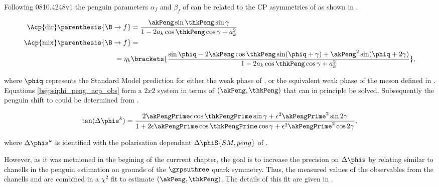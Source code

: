 Following {\color{red} 0810.4248v1} the penguin parameters $\alpha_f$ and $\beta_f$ of 
can be related to the CP asymmetries of  as shown in .

\begin{subequations}
  \label{bsjpsiphi_peng_acp_obs}
\begin{align}
  \Acp{\rm dir}\parenthesis{\B\to f} &= \frac{ \akPeng \sin\thkPeng \sin\gamma} {1 - 2 a_k \cos\thkPeng \cos\gamma + a_k^{2}}
  \label{bsjpsiphi_peng_acp_dir} \\
  \Acp{\rm mix}\parenthesis{\B\to f} &= \nonumber \\
   = \eta_k & \brackets{\frac{\sin\phiq - 2\akPeng \cos\thkPeng\sin(\phiq+\gamma) + \akPeng^2 \sin(\phiq+2\gamma)}
                                                                 {1 - 2 a_k \cos\thkPeng \cos\gamma + a_k^{2}} },
  \label{bsjpsiphi_peng_acp_mix}
\end{align}
\end{subequations}

\noindent where $\phiq$ represents the Standard Model prediction for either the weak phase \phis of ,
or the equivalent weak phase \phid of the \Bd meson defined in .
Equations \ref{bsjpsiphi_peng_acp_obs} form a $2x2$ system in terms of $(\akPeng,\thkPeng)$ that can in principle be solved.
Subsequently the penguin shift to \phis could be determined from .

\begin{equation}
\centering
\tan(\Delta\phis^k) = \frac{ 2\akPengPrime\epsilon\cos\thkPengPrime \sin\gamma + \epsilon^2\akPengPrime^2 \sin2\gamma}
                             {1 + 2\epsilon\akPengPrime \cos\thkPengPrime \cos\gamma + \epsilon^2\akPengPrime^2 \cos2\gamma},
\label{tandelta}
\end{equation}

\noindent where $\Delta\phis^k$ is identified with the polarisation dependant $\Delta\phiS{SM, peng}$ of .

However, as it was metnioned in the begining of the currrent chapter, the goal is to increase the precision on $\Delta{\phis}$
by relating similar to \BsJpsiPhi chanells in the penguin estimation on grounds of the $\grpsuthree$ quark symmetry.
Thus, the measured values of the observables  from the chanells \BsJpsiKst and \BdJpsiRho
are combined in a $\chi^2$ fit to estimate $(\akPeng,\thkPeng)$. The details of this fit are given in .


